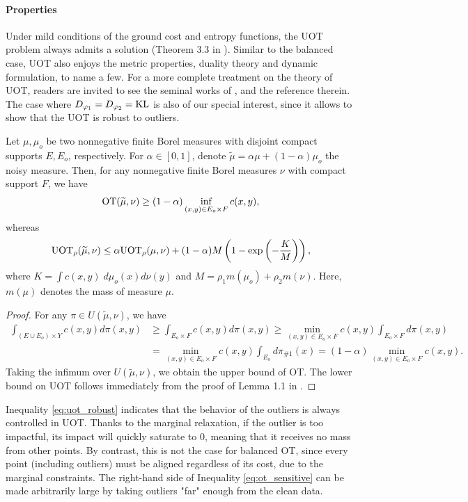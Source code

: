 \paragraph{Properties} Under mild conditions of the ground cost and entropy functions,
the UOT problem always admits a solution (Theorem 3.3 in \citep{Liero18}).
Similar to the balanced case, UOT also enjoys the metric properties, duality theory and
dynamic formulation, to name a few. For a more complete treatment on the theory of UOT,
readers are invited to see the seminal works of \citet{Liero18,Chizat18b}, and the reference therein.
The case where $D_{\varphi_1} = D_{\varphi_2} = \text{KL}$ is also of our special interest,
since it allows to show that the UOT is robust to outliers.
\begin{proposition}
  \label{prop:uot_robust}
  Let $\mu, \mu_o$ be two nonnegative finite Borel measures with disjoint compact supports $E, E_o$,
  respectively. For $\alpha \in [0, 1]$, denote $\widetilde{\mu} = \alpha \mu + (1 - \alpha) \mu_o$
  the noisy measure. Then, for any nonnegative finite Borel measures $\nu$
  with compact support $F$, we have
  \begin{align}
    \label{eq:ot_sensitive}
    \text{OT}(\widetilde{\mu}, \nu) \geq
    (1 - \alpha) \inf_{(x, y) \in E_o \times F} c(x, y),
  \end{align}
  whereas
  \begin{align}
    \label{eq:uot_robust}
    \text{UOT}_{\rho}(\widetilde{\mu}, \nu) \leq \alpha \text{UOT}_{\rho}(\mu, \nu) +
    (1 - \alpha) M
    \left( 1 - \exp \left( -\frac{K}{M} \right) \right),
  \end{align}
  where $K = \int c(x, y) \; d\mu_o(x) d\nu(y)$ and $M = \rho_1 m(\mu_o) + \rho_2 m(\nu)$.
  Here, $m(\mu)$ denotes the mass of measure $\mu$.
\end{proposition}
\begin{proof}
  For any $\pi \in U(\widetilde{\mu}, \nu)$, we have
  \begin{align}
      \int_{(E \cup E_o) \times Y} c(x, y) d\pi(x, y) &\geq \int_{E_o \times F} c(x, y) d\pi(x, y)
      \geq \min_{(x, y) \in E_o \times F} c(x, y ) \int_{E_o \times F} d\pi(x, y) \\
      &= \min_{(x, y) \in E_o \times F} c(x, y) \int_{E_o} d\pi_{\# 1}(x)
      = (1 - \alpha) \min_{(x, y) \in E_o \times F} c(x, y).
  \end{align}
  Taking the infimum over $U(\widetilde{\mu}, \nu)$, we obtain the upper bound of OT.
  The lower bound on UOT follows immediately from the proof of Lemma 1.1 in \citep{Fatras21}.
\end{proof}
Inequality \eqref{eq:uot_robust} indicates that the behavior of the outliers is always controlled
in UOT. Thanks to the marginal relaxation, if the outlier is too impactful,
its impact will quickly saturate to $0$, meaning that it receives no mass from other points.
By contrast, this is not the case for balanced OT, since every point (including outliers)
must be aligned regardless of its cost, due to the marginal constraints. The right-hand side of
Inequality \eqref{eq:ot_sensitive} can be made arbitrarily large by taking outliers "far" enough
from the clean data.

